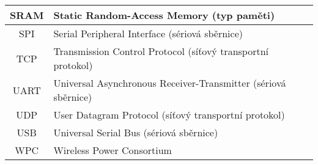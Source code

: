 \begin{longtable}{|c|l|}
SRAM & Static Random-Access Memory (typ paměti) \\ \hline
SPI  & Serial Peripheral Interface (sériová sběrnice) \\ \hline
TCP  & Transmission Control Protocol (síťový transportní protokol) \\ \hline
UART & Universal Asynchronous Receiver-Transmitter (sériová sběrnice) \\ \hline
UDP  & User Datagram Protocol (síťový transportní protokol) \\ \hline
USB  & Universal Serial Bus (sériová sběrnice) \\ \hline
WPC  & Wireless Power Consortium \\ \hline

\end{longtable}